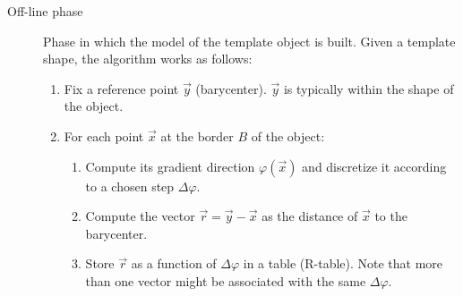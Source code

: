 \begin{description}
    \item[Off-line phase] 
        Phase in which the model of the template object is built.
        Given a template shape, the algorithm works as follows:
        \begin{enumerate}
            \item Fix a reference point $\vec{y}$ (barycenter). $\vec{y}$ is typically within the shape of the object.
            \item For each point $\vec{x}$ at the border $B$ of the object:
                \begin{enumerate}
                    \item Compute its gradient direction $\varphi(\vec{x})$ and discretize it according to a chosen step $\Delta \varphi$.
                    \item Compute the vector $\vec{r} = \vec{y} - \vec{x}$ as the distance of $\vec{x}$ to the barycenter.
                    \item Store $\vec{r}$ as a function of $\Delta \varphi$ in a table (R-table).
                        Note that more than one vector might be associated with the same $\Delta \varphi$.
                \end{enumerate}
        \end{enumerate}
        

\end{description}
